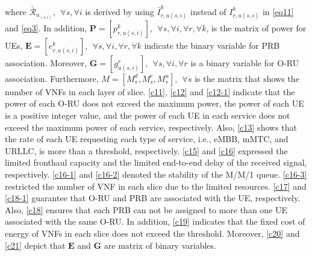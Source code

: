 \documentclass[lettersize,journal]{IEEEtran}
\begin{document}
\noindent where $\bar{\mathcal{R}}_{u_{(s,i)}}, \:\:\forall s , \forall i$ is derived by using $\bar{I}_{r,u(s,i)}^{k}$ instead of $I_{r,u(s,i)}^{k}$ in  \eqref{eq11} and \eqref{eq3}.
In addition, $\boldsymbol{P} =[p_{r,u(s,i)}^{k}], \:\: \forall s , \forall i, \forall r, \forall k $, is the matrix of power for UEs, $\boldsymbol{E} =[e_{r,u(s,i)}^k], \:\: \forall s , \forall i, \forall r, \forall k$ indicate the binary variable for PRB association. Moreover, $\boldsymbol{G} =[g_{u(s,i)}^r], \:\: \forall s , \forall i, \forall r$ is a binary variable for O-RU association. Furthermore, $M = [M_s^d, M_s^c, M_s^u], \:\: \forall s$ is the matrix that shows the number of VNFs in each layer of slice.
\eqref{c11}, \eqref{c12} and \eqref{c12-1} indicate that the power of each O-RU does not exceed the maximum power, the power of each UE is a positive integer value, and the power of each UE in each service does not exceed the maximum power of each service, respectively.
Also, \eqref{c13} shows that the rate of each UE requesting each type of service, i.e., eMBB, mMTC, and URLLC, is more than a threshold, respectively.
\eqref{c15} and \eqref{c16} expressed the limited fronthaul capacity and the limited end-to-end delay of the received signal, respectively.
\eqref{c16-1} and \eqref{c16-2} denoted the stability of the M/M/1 queue.
\eqref{c16-3} restricted the number of VNF in each slice due to the limited resources.
\eqref{c17} and \eqref{c18-1} guarantee that O-RU and PRB are associated with the UE, respectively.
Also, \eqref{c18} ensures that each PRB can not be assigned to more than one UE associated with the same O-RU.
In addition, \eqref{c19} indicates that the fixed cost of energy of VNFs in each slice does not exceed the threshold.
Moreover, \eqref{c20} and \eqref{c21} depict that $\boldsymbol{E}$ and $\boldsymbol{G}$ are matrix of binary variables.
\end{document}
